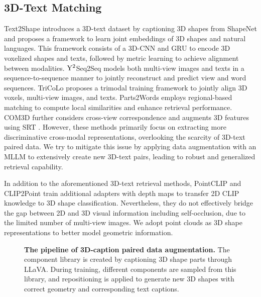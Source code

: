 \subsection{3D-Text Matching}
Text2Shape \cite{chen2019text2shape} introduces a 3D-text dataset by captioning 3D shapes from ShapeNet \cite{chang2015shapenet} and proposes a framework to learn joint embeddings of 3D shapes and natural languages. This framework consists of a 3D-CNN and GRU \cite{chung2014empirical} to encode 3D voxelized shapes and texts, followed by metric learning to achieve alignment between modalities. $\rm Y^{2}$Seq2Seq \cite{han2019y2seq2seq} models both multi-view images and texts in a sequence-to-sequence manner to jointly reconstruct and predict view and word sequences. TriCoLo \cite{ruan2024tricolo} proposes a trimodal training framework to jointly align 3D voxels, multi-view images, and texts.
Parts2Words \cite{tang2021parts2words} employs regional-based matching to compute local similarities and enhance retrieval performance. COM3D \cite{wu2024com3d} further considers cross-view correspondence and augments 3D features using SRT \cite{sajjadi2022scene}. However, these methods primarily focus on extracting more discriminative cross-modal representations, overlooking the scarcity of 3D-text paired data. We try to mitigate this issue by applying data augmentation with an MLLM to extensively create new 3D-text pairs, leading to robust and generalized retrieval capability.


In addition to the aforementioned 3D-text retrieval methods, PointCLIP \cite{zhang2022pointclip} and CLIP2Point \cite{huang2023clip2point} train additional adapters with depth maps to transfer 2D CLIP knowledge to 3D shape classification. Nevertheless, they do not effectively bridge the gap between 2D and 3D visual information including self-occlusion, due to the limited number of multi-view images. We adopt point clouds as 3D shape representations to better model geometric information.

\begin{figure*}[t]
\centering
   
\caption{\textbf{The pipeline of 3D-caption paired data augmentation.} The component library is created by captioning 3D shape parts through LLaVA. During training, different components are sampled from this library, and repositioning is applied to generate new 3D shapes with correct geometry and corresponding text captions.}
\label{figure::data augmentation}
\end{figure*}